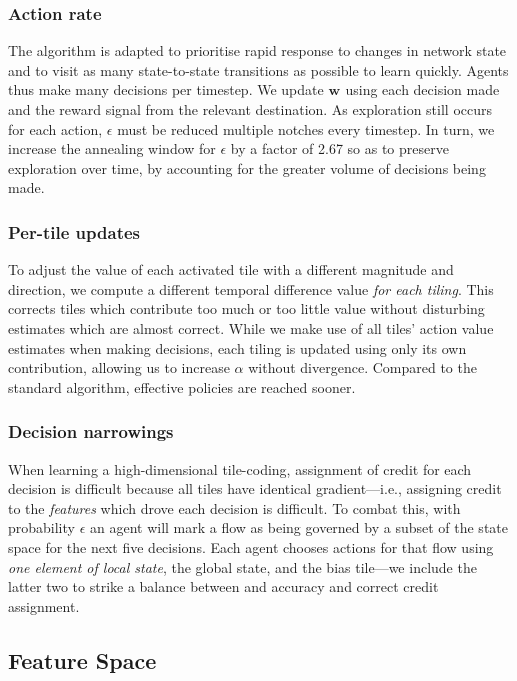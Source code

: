 \documentclass[10pt, times, conference, letterpaper]{IEEEtran}
\newcommand{\wvec}[1]{\ensuremath{\bm{w}_{#1}}}
\begin{document}
\subsubsection{Action rate}
The algorithm is adapted to prioritise rapid response to changes in network state and to visit as many state-to-state transitions as possible to learn quickly.
Agents thus make many decisions per timestep.
We update $\wvec{}$ using each decision made and the reward signal from the relevant destination.
As exploration still occurs for each action, $\epsilon$ must be reduced multiple notches every timestep.
In turn, we increase the annealing window for $\epsilon$ by a factor of \num{2.67} so as to preserve exploration over time, by accounting for the greater volume of decisions being made.

\subsubsection{Per-tile updates}
To adjust the value of each activated tile with a different magnitude and direction, we compute a different temporal difference value \emph{for each tiling}.
This corrects tiles which contribute too much or too little value without disturbing estimates which are almost correct.
While we make use of all tiles' action value estimates when making decisions, each tiling is updated using only its own contribution, allowing us to increase $\alpha$ without divergence.
Compared to the standard algorithm, effective policies are reached sooner.

\subsubsection{Decision narrowings}
When learning a high-dimensional tile-coding, assignment of credit for each decision is difficult because all tiles have identical gradient---i.e., assigning credit to the \emph{features} which drove each decision is difficult.
To combat this, with probability $\epsilon$ an agent will mark a flow as being governed by a subset of the state space for the next five decisions.
Each agent chooses actions for that flow using \emph{one element of local state}, the global state, and the bias tile---we include the latter two to strike a balance between and accuracy and correct credit assignment.

\subsection{Feature Space}\label{sec:feature-space}
\end{document}
